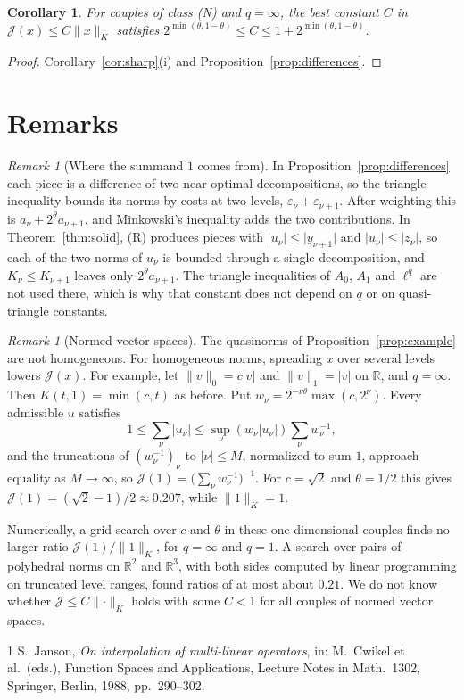 \documentclass[11pt]{article}
\newtheorem{corollary}[theorem]{Corollary}
\theoremstyle{remark}
\newtheorem{remark}[theorem]{Remark}
\newcommand{\abs}[1]{\lvert #1\rvert}
\newcommand{\norm}[2]{\lVert #1\rVert_{#2}}
\newcommand{\cJ}{\mathcal J}
\newcommand{\R}{\mathbb R}
\begin{document}
\begin{corollary}
  For couples of class (N) and \(q = \infty\), the best constant \(C\) in
  \(\cJ(x) \le C\norm{x}{K}\) satisfies
  \(2^{\min(\theta,1-\theta)} \le C \le 1 + 2^{\min(\theta,1-\theta)}\).
\end{corollary}

\begin{proof}
  Corollary~\ref{cor:sharp}(i) and Proposition~\ref{prop:differences}.
\end{proof}

\section{Remarks}

\begin{remark}[Where the summand \(1\) comes from]
  In Proposition~\ref{prop:differences} each piece is a difference of two near-optimal
  decompositions, so the triangle inequality bounds its norms by costs at two levels,
  \(\varepsilon_\nu + \varepsilon_{\nu+1}\). After weighting this is
  \(a_\nu + 2^\theta a_{\nu+1}\), and Minkowski's inequality adds the two contributions. In
  Theorem~\ref{thm:solid}, (R) produces pieces with \(\abs{u_\nu} \le \abs{y_{\nu+1}}\) and
  \(\abs{u_\nu} \le \abs{z_\nu}\), so each of the two norms of \(u_\nu\) is bounded through a
  single decomposition, and \(K_\nu \le K_{\nu+1}\) leaves only \(2^\theta a_{\nu+1}\). The
  triangle inequalities of \(A_0\), \(A_1\) and \(\ell^q\) are not used there, which is why that
  constant does not depend on \(q\) or on quasi-triangle constants.
\end{remark}

\begin{remark}[Normed vector spaces]
  The quasinorms of Proposition~\ref{prop:example} are not homogeneous. For homogeneous norms,
  spreading \(x\) over several levels lowers \(\cJ(x)\). For example, let
  \(\norm{v}{0} = c\abs{v}\) and \(\norm{v}{1} = \abs{v}\) on \(\R\), and \(q = \infty\). Then
  \(K(t,1) = \min(c, t)\) as before. Put \(w_\nu = 2^{-\nu\theta}\max(c, 2^\nu)\). Every
  admissible \(u\) satisfies
  \[
    1 \le \sum_\nu \abs{u_\nu} \le \sup_\nu (w_\nu\abs{u_\nu}) \sum_\nu w_\nu^{-1},
  \]
  and the truncations of \((w_\nu^{-1})_\nu\) to \(\abs{\nu} \le M\), normalized to sum \(1\),
  approach equality as \(M \to \infty\), so
  \(\cJ(1) = \bigl(\sum_\nu w_\nu^{-1}\bigr)^{-1}\). For \(c = \sqrt2\) and \(\theta = 1/2\)
  this gives \(\cJ(1) = (\sqrt2 - 1)/2 \approx 0.207\), while \(\norm{1}{K} = 1\).

  Numerically, a grid search over \(c\) and \(\theta\) in these one-dimensional couples finds
  no larger ratio \(\cJ(1)/\norm{1}{K}\), for \(q = \infty\) and \(q = 1\). A search over pairs of
  polyhedral norms on \(\R^2\) and \(\R^3\), with both sides computed by linear programming on
  truncated level ranges, found ratios of at most about \(0.21\). We do not know whether
  \(\cJ \le C\norm{\cdot}{K}\) holds with some \(C < 1\) for all couples of normed vector
  spaces.
\end{remark}

\begin{thebibliography}{1}
  S.~Janson, \emph{On interpolation of multi-linear operators}, in: M.~Cwikel et al.\ (eds.),
  Function Spaces and Applications, Lecture Notes in Math.\ 1302, Springer, Berlin, 1988,
  pp.~290--302.
\end{thebibliography}
\end{document}
